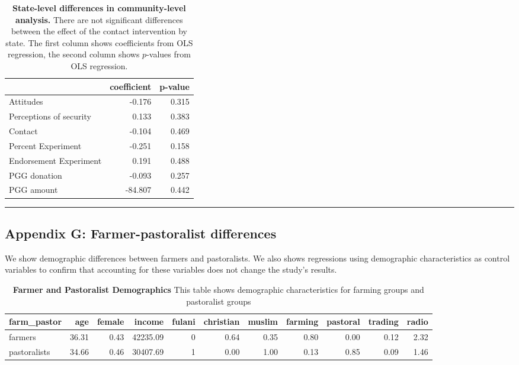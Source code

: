 \documentclass[
]{article}
\begin{document}
\begin{table}[H]
\begin{center}
\label{tab:state_tab}
\caption{\textbf{State-level differences in community-level analysis.} There are not significant differences between the effect of the contact intervention by state. The first column shows coefficients from OLS regression, the second column shows $p$-values from OLS regression.}
\smallskip

\begin{tabular}{l|r|r}
\hline
  & coefficient & p-value\\
\hline
Attitudes & -0.176 & 0.315\\
\hline
Perceptions of security & 0.133 & 0.383\\
\hline
Contact & -0.104 & 0.469\\
\hline
Percent Experiment & -0.251 & 0.158\\
\hline
Endorsement Experiment & 0.191 & 0.488\\
\hline
PGG donation & -0.093 & 0.257\\
\hline
PGG amount & -84.807 & 0.442\\
\hline
\end{tabular}


\end{center}
\end{table}

\begin{center}\rule{0.5\linewidth}{0.5pt}\end{center}

\hypertarget{appendix-g-farmer-pastoralist-differences}{%
\subsection{Appendix G: Farmer-pastoralist
differences}\label{appendix-g-farmer-pastoralist-differences}}

We show demographic differences between farmers and pastoralists. We
also shows regressions using demographic characteristics as control
variables to confirm that accounting for these variables does not change
the study's results.

\begin{table}[H]
\begin{center}
\label{tab:demo_tab_overall1}
\caption{\textbf{Farmer and Pastoralist Demographics} This table shows demographic characteristics for farming groups and pastoralist groups}
\smallskip

\begin{tabular}{l|r|r|r|r|r|r|r|r|r|r}
\hline
farm\_pastor & age & female & income & fulani & christian & muslim & farming & pastoral & trading & radio\\
\hline
farmers & 36.31 & 0.43 & 42235.09 & 0 & 0.64 & 0.35 & 0.80 & 0.00 & 0.12 & 2.32\\
\hline
pastoralists & 34.66 & 0.46 & 30407.69 & 1 & 0.00 & 1.00 & 0.13 & 0.85 & 0.09 & 1.46\\
\hline
\end{tabular}


\end{center}
\end{table}
\end{document}
